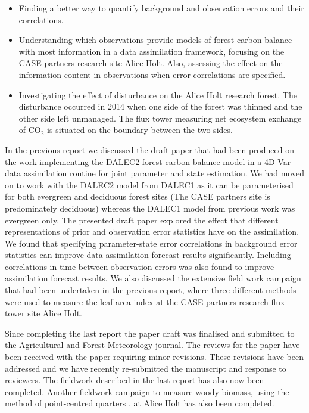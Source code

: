 \documentclass[11pt]{article}
\begin{document}
\begin{itemize}
\item Finding a better way to quantify background and observation errors and their correlations.
\item Understanding which observations provide models of forest carbon balance with most information in a data assimilation framework, focusing on the CASE partners research site Alice Holt. Also, assessing the effect on the information content in observations when error correlations are specified.
\item Investigating the effect of disturbance on the Alice Holt research forest. The disturbance occurred in 2014 when one side of the forest was thinned and the other side left unmanaged. The flux tower measuring net ecosystem exchange of $\text{CO}_{2}$ is situated on the boundary between the two sides. 
\end{itemize}

In the previous report we discussed the draft paper that had been produced on the work implementing the DALEC2 forest carbon balance model \citep{Bloom2015} in a 4D-Var data assimilation routine for joint parameter and state estimation. We had moved on to work with the DALEC2 model from DALEC1 as it can be parameterised for both evergreen and deciduous forest sites (The CASE partners site is predominately deciduous) whereas the DALEC1 model from previous work was evergreen only. The presented draft paper explored the effect that different representations of prior and observation error statistics have on the assimilation. We found that specifying parameter-state error correlations in background error statistics can improve data assimilation forecast results significantly. Including correlations in time between observation errors was also found to improve assimilation forecast results. We also discussed the extensive field work campaign that had been undertaken in the previous report, where three different methods were used to measure the leaf area index at the CASE partners research flux tower site Alice Holt.    

Since completing the last report the paper draft was finalised and submitted to the Agricultural and Forest Meteorology journal. The reviews for the paper have been received with the paper requiring minor revisions. These revisions have been addressed and we have recently re-submitted the manuscript and response to reviewers. The fieldwork described in the last report has also now been completed. Another fieldwork campaign to measure woody biomass, using the method of point-centred quarters \citep{dahdouh2006empirical}, at Alice Holt has also been completed.    
\end{document}
